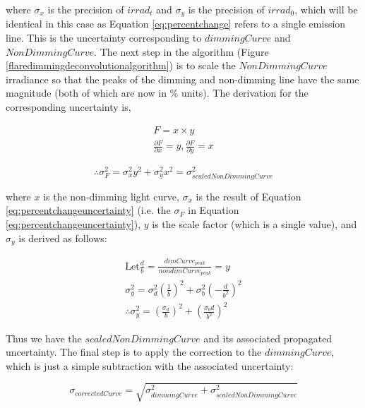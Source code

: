 \noindent where $\sigma _x$ is the precision of $irrad_t$ and $\sigma _y$ is the precision of $irrad_0$, which will be identical in this case as Equation \ref{eq:percentchange} refers to a single emission line. This is the uncertainty corresponding to $dimmingCurve$ and $NonDimmingCurve$. The next step in the algorithm (Figure \ref{flaredimmingdeconvolutionalgorithm}) is to scale the $NonDimmingCurve$ irradiance so that the peaks of the dimming and non-dimming line have the same magnitude (both of which are now in \% units). The derivation for the corresponding uncertainty is, 

\begin{gather*}
    F = x \times y \\
    \frac{\partial F}{\partial x} = y , \frac{\partial F}{\partial y} = x
    \label{eq:scaledbrightcurvederivation}
\end{gather*}

\begin{equation}
    \therefore \sigma^2_F = \sigma^2_x y^2 + \sigma^2_y x^2 = \sigma^2_{scaledNonDimmingCurve}
    \label{eq:scaledbrightcurvestep1}
\end{equation}

\noindent where $x$ is the non-dimming light curve, $\sigma _x$ is the result of Equation \ref{eq:percentchangeuncertainty} (i.e. the $\sigma _F$ in Equation \ref{eq:percentchangeuncertainty}), $y$ is the scale factor (which is a single value), and $\sigma _y$ is derived as follows: 

\begin{gather*}
    \text{Let} \frac{d}{b} = \frac{dimCurve_{peak}}{nondimCurve_{peak}} = y \\
    \sigma^2_y = \sigma^2_d(\frac{1}{b})^2 + \sigma^2_b(-\frac{d}{b^2})^2 \\
    \therefore \sigma^2_y = (\frac{\sigma _d}{b})^2 + (\frac{\sigma _bd}{b^2})^2
    \label{eq:scalefactoruncertainty}
\end{gather*}

Thus we have the $scaledNonDimmingCurve$ and its associated propagated uncertainty. The final step is to apply the correction to the $dimmingCurve$, which is just a simple subtraction with the associated uncertainty: 

\begin{equation}
    \sigma _{correctedCurve} = \sqrt{\sigma^2_{dimmingCurve} + \sigma^2_{scaledNonDimmingCurve}}
    \label{eq:correctedcurveuncertainty}
\end{equation}

